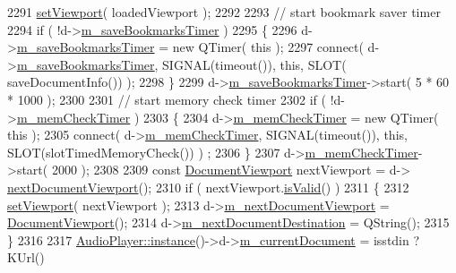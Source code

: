 \begin{DoxyCode}
2291     \hyperlink{classOkular_1_1Document_a1afaf8b8b5cb1e715949024fb75bb767}{setViewport}( loadedViewport );
2292 
2293     \textcolor{comment}{// start bookmark saver timer}
2294     \textcolor{keywordflow}{if} ( !d->\hyperlink{classOkular_1_1DocumentPrivate_a1d64b1924e24e32715cc5c7b3471595f}{m\_saveBookmarksTimer} )
2295     \{
2296         d->\hyperlink{classOkular_1_1DocumentPrivate_a1d64b1924e24e32715cc5c7b3471595f}{m\_saveBookmarksTimer} = \textcolor{keyword}{new} QTimer( \textcolor{keyword}{this} );
2297         connect( d->\hyperlink{classOkular_1_1DocumentPrivate_a1d64b1924e24e32715cc5c7b3471595f}{m\_saveBookmarksTimer}, SIGNAL(timeout()), \textcolor{keyword}{this}, SLOT(
      saveDocumentInfo()) );
2298     \}
2299     d->\hyperlink{classOkular_1_1DocumentPrivate_a1d64b1924e24e32715cc5c7b3471595f}{m\_saveBookmarksTimer}->start( 5 * 60 * 1000 );
2300 
2301     \textcolor{comment}{// start memory check timer}
2302     \textcolor{keywordflow}{if} ( !d->\hyperlink{classOkular_1_1DocumentPrivate_aa403a95dfe9f344c12c7409319aaf62f}{m\_memCheckTimer} )
2303     \{
2304         d->\hyperlink{classOkular_1_1DocumentPrivate_aa403a95dfe9f344c12c7409319aaf62f}{m\_memCheckTimer} = \textcolor{keyword}{new} QTimer( \textcolor{keyword}{this} );
2305         connect( d->\hyperlink{classOkular_1_1DocumentPrivate_aa403a95dfe9f344c12c7409319aaf62f}{m\_memCheckTimer}, SIGNAL(timeout()), \textcolor{keyword}{this}, SLOT(slotTimedMemoryCheck()) )
      ;
2306     \}
2307     d->\hyperlink{classOkular_1_1DocumentPrivate_aa403a95dfe9f344c12c7409319aaf62f}{m\_memCheckTimer}->start( 2000 );
2308 
2309     \textcolor{keyword}{const} \hyperlink{classOkular_1_1DocumentViewport}{DocumentViewport} nextViewport = d->
      \hyperlink{classOkular_1_1DocumentPrivate_a53d9d28d2ad9555b577ab0c9b1a1c142}{nextDocumentViewport}();
2310     \textcolor{keywordflow}{if} ( nextViewport.\hyperlink{classOkular_1_1DocumentViewport_a13161b17f2d0b68bf033955f81d41584}{isValid}() )
2311     \{
2312         \hyperlink{classOkular_1_1Document_a1afaf8b8b5cb1e715949024fb75bb767}{setViewport}( nextViewport );
2313         d->\hyperlink{classOkular_1_1DocumentPrivate_af6aae2128fb788ae1693699506a86c0d}{m\_nextDocumentViewport} = \hyperlink{classOkular_1_1DocumentViewport}{DocumentViewport}();
2314         d->\hyperlink{classOkular_1_1DocumentPrivate_a0c531a03865395da325584dbae6e1efe}{m\_nextDocumentDestination} = QString();
2315     \}
2316 
2317     \hyperlink{classOkular_1_1AudioPlayer_a5bbc067e81b46451098a2a0becf23e67}{AudioPlayer::instance}()->d->\hyperlink{classOkular_1_1AudioPlayerPrivate_a086fc9c3cbe263bd8c67a6afa8b7373d}{m\_currentDocument} = isstdin ? KUrl() 

\end{DoxyCode}
